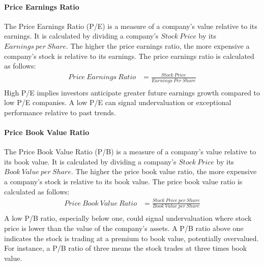 \documentclass[../xlapes02]{subfiles}
\begin{document}
    \paragraph{Price Earnings Ratio}\label{par:price-earnings-ratio}
    The Price Earnings Ratio (P/E) is a measure of a company's value relative to its earnings. It is calculated by dividing a company's $Stock\ Price$ by its $Earnings\ per\ Share$. The higher the price earnings ratio, the more expensive a company's stock is relative to its earnings. The price earnings ratio is calculated as follows:
    \begin{equation}
        \label{eq:price-earnings-ratio}
        \begin{split}
            Price\ Earnings\ Ratio&=\frac{Stock\ Price}{Earnings\ Per\ Share}\\
        \end{split}
    \end{equation}
    High P/E implies investors anticipate greater future earnings growth compared to low P/E companies. A low P/E can signal undervaluation or exceptional performance relative to past trends.

    \paragraph{Price Book Value Ratio}\label{par:price-book-value-ratio}
    The Price Book Value Ratio (P/B) is a measure of a company's value relative to its book value. It is calculated by dividing a company's $Stock\ Price$ by its $Book\ Value\ per\ Share$. The higher the price book value ratio, the more expensive a company's stock is relative to its book value. The price book value ratio is calculated as follows:
    \begin{equation}
        \label{eq:price-book-value-ratio}
        \begin{split}
            Price\ Book\ Value\ Ratio&=\frac{Stock\ Price\ per\ Share}{Book\ Value\ per\ Share}\\
        \end{split}
    \end{equation}
    A low P/B ratio, especially below one, could signal undervaluation where stock price is lower than the value of the company's assets. A P/B ratio above one indicates the stock is trading at a premium to book value, potentially overvalued. For instance, a P/B ratio of three means the stock trades at three times book value.
\end{document}
